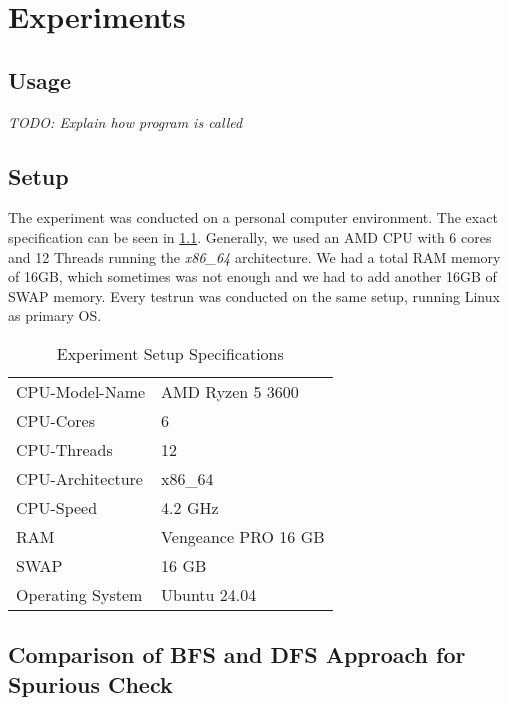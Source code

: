 \chapter{Experiments}

\section{Usage}
\textit{TODO: Explain how program is called}

\section{Setup}
The experiment was conducted on a personal computer environment. The exact specification can be seen in \cref{table:ExperimentSpecs}. Generally, we used an AMD CPU with 6 cores and 12 Threads running the \textit{x86\_64} architecture. We had a total RAM memory of 16GB, which sometimes was not enough and we had to add another 16GB of SWAP memory. Every testrun was conducted on the same setup, running Linux as primary OS.

\begin{table}[H]
    \centering
    \caption{Experiment Setup Specifications}
    \begin{tabular}{ |l|l| }
     \hline
     CPU-Model-Name & AMD Ryzen 5 3600\\
     CPU-Cores & 6\\
     CPU-Threads & 12\\
     CPU-Architecture & x86\_64\\
     CPU-Speed & 4.2 GHz\\
     RAM & Vengeance PRO 16 GB\\
     SWAP & 16 GB\\
     Operating System & Ubuntu 24.04 \\
     \hline
    \end{tabular}
\label{table:ExperimentSpecs}
\end{table}




\section{Comparison of BFS and DFS Approach for Spurious Check}


